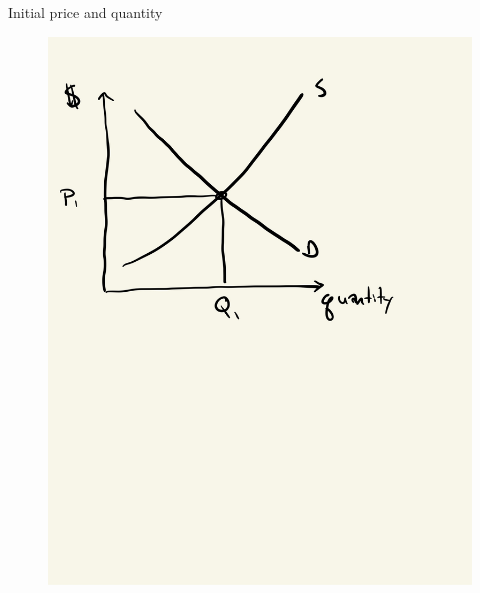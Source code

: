 \documentclass{beamer}
\begin{document}
\begin{frame}{Initial price and quantity}

	\begin{figure}
	\includegraphics[scale=0.15]{./lecture_includes/elasticity_1.jpg}
	\end{figure}
\end{frame}
\end{document}
